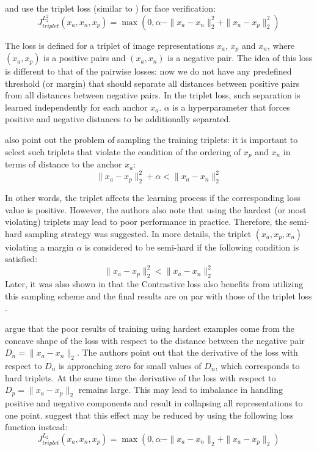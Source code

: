 \citep{SchroffKP15} and \citep{parkhi2015deep} use the triplet loss (similar to \citep{weinberger2009distance}) for face verification:
\begin{equation}
\label{eq:triplet}
J_{triplet}^{L_2^2}(x_a,x_n,x_p)= \max(0, \alpha - \|x_a - x_n \|^2_{2} + \|x_a - x_p \|^2_{2})
\end{equation}

The loss is defined for a triplet of image representations $x_a$, $x_p$ and $x_n$, where $(x_a,x_p)$ is a positive pairs and $(x_a,x_n)$ is a negative pair. The idea of this loss is different to that of the pairwise losses: now we do not have any predefined threshold (or margin) that should separate all distances between positive pairs from all distances between negative pairs. In the triplet loss, such separation is learned independently for each anchor $x_a$. $\alpha$ is a hyperparameter that forces positive and negative distances to be additionally separated. 

\citep{SchroffKP15} also point out the problem of sampling the training triplets: it is important to select such triplets that violate the condition of the ordering of $x_p$ and $x_n$ in terms of distance to the anchor $x_a$:
\begin{equation*}
    \|x_a - x_p \|^2_{2} + \alpha <  \|x_a - x_n \|^2_{2}
\end{equation*}

In other words, the triplet affects the learning process if the corresponding loss value  is positive. However, the authors also note that using the hardest (or most violating) triplets may lead to poor performance in practice. Therefore, the semi-hard sampling strategy was suggested. In more details, the triplet $(x_a, x_p, x_n)$ violating a margin $\alpha$ is considered to be semi-hard if the following condition is satisfied:
\begin{equation*}
    \|x_a - x_p \|^2_{2} <  \|x_a - x_n \|^2_{2}
\end{equation*}
Later, it was also shown in \citep{wu2017sampling} that the Contrastive loss  also benefits from utilizing this sampling scheme and the final results are on par with those of the triplet loss .

\citep{wu2017sampling} argue that the poor results of training using hardest examples come from the concave shape of the loss  with respect to the distance between the negative pair $D_n = \|x_a - x_n \|_{2}$. The authors point out that the derivative of the loss with respect to $D_n$ is approaching zero for small values of $D_n$, which corresponds to hard triplets. At the same time the derivative of the loss with respect to $D_p = \|x_a - x_p \|_{2}$ remains large. This may lead to imbalance in handling positive and negative components and result in collapsing all representations to one point. \citep{wu2017sampling} suggest that this effect may be reduced by using the following loss function instead:
\begin{equation}
\label{eq:triplet_l}
J_{triplet}^{L_2}(x_a,x_n,x_p)= \max(0, \alpha - \|x_a - x_n \|_{2} + \|x_a - x_p \|_{2})
\end{equation}

